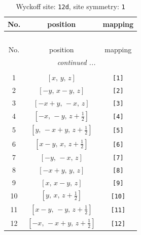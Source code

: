 \documentclass[fleqn,8pt]{jsarticle}
\begin{document}
\begin{longtable}{ccc}
\caption{Wyckoff site: {\tt 12d}, site symmetry: {\tt 1}}
 \\
 \hline \hline
No. & position & mapping \\ \hline \endfirsthead

\multicolumn{2}{l}{\tablename\ \thetable{}} \\
 \hline \hline
No. & position & mapping \\ \hline \endhead

 \hline \hline
\multicolumn{2}{r}{\footnotesize\it continued ...} \\ \endfoot

 \hline \hline
\multicolumn{2}{r}{} \\ \endlastfoot

1 & $\left[ x,\, y,\, z \right]$ & {\tt [1]} \\ \hline
2 & $\left[ - y,\, x - y,\, z \right]$ & {\tt [2]} \\ \hline
3 & $\left[ - x + y,\, - x,\, z \right]$ & {\tt [3]} \\ \hline
4 & $\left[ - x,\, - y,\, z + \frac{1}{2} \right]$ & {\tt [4]} \\ \hline
5 & $\left[ y,\, - x + y,\, z + \frac{1}{2} \right]$ & {\tt [5]} \\ \hline
6 & $\left[ x - y,\, x,\, z + \frac{1}{2} \right]$ & {\tt [6]} \\ \hline
7 & $\left[ - y,\, - x,\, z \right]$ & {\tt [7]} \\ \hline
8 & $\left[ - x + y,\, y,\, z \right]$ & {\tt [8]} \\ \hline
9 & $\left[ x,\, x - y,\, z \right]$ & {\tt [9]} \\ \hline
10 & $\left[ y,\, x,\, z + \frac{1}{2} \right]$ & {\tt [10]} \\ \hline
11 & $\left[ x - y,\, - y,\, z + \frac{1}{2} \right]$ & {\tt [11]} \\ \hline
12 & $\left[ - x,\, - x + y,\, z + \frac{1}{2} \right]$ & {\tt [12]} \\
\end{longtable}
\end{document}
